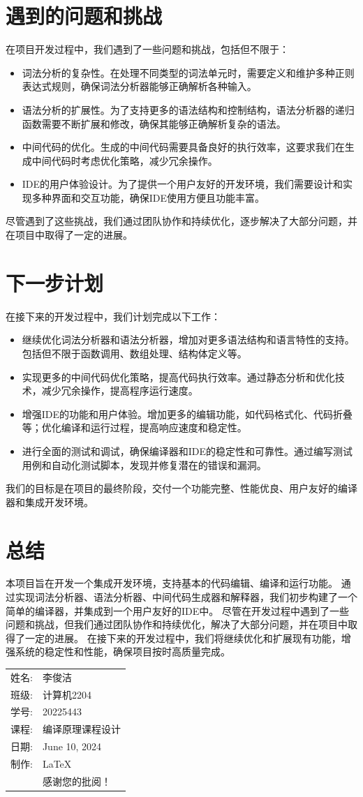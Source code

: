 \documentclass[12pt]{article}
\begin{document}
\section{遇到的问题和挑战}
\quad\quad
在项目开发过程中，我们遇到了一些问题和挑战，包括但不限于：
\begin{itemize}
    \item 词法分析的复杂性。在处理不同类型的词法单元时，需要定义和维护多种正则表达式规则，确保词法分析器能够正确解析各种输入。
    \item 语法分析的扩展性。为了支持更多的语法结构和控制结构，语法分析器的递归函数需要不断扩展和修改，确保其能够正确解析复杂的语法。
    \item 中间代码的优化。生成的中间代码需要具备良好的执行效率，这要求我们在生成中间代码时考虑优化策略，减少冗余操作。
    \item IDE的用户体验设计。为了提供一个用户友好的开发环境，我们需要设计和实现多种界面和交互功能，确保IDE使用方便且功能丰富。
\end{itemize}

尽管遇到了这些挑战，我们通过团队协作和持续优化，逐步解决了大部分问题，并在项目中取得了一定的进展。

\section{下一步计划}
\quad\quad
在接下来的开发过程中，我们计划完成以下工作：
\begin{itemize}
    \item 继续优化词法分析器和语法分析器，增加对更多语法结构和语言特性的支持。包括但不限于函数调用、数组处理、结构体定义等。
    \item 实现更多的中间代码优化策略，提高代码执行效率。通过静态分析和优化技术，减少冗余操作，提高程序运行速度。
    \item 增强IDE的功能和用户体验。增加更多的编辑功能，如代码格式化、代码折叠等；优化编译和运行过程，提高响应速度和稳定性。
    \item 进行全面的测试和调试，确保编译器和IDE的稳定性和可靠性。通过编写测试用例和自动化测试脚本，发现并修复潜在的错误和漏洞。
\end{itemize}

我们的目标是在项目的最终阶段，交付一个功能完整、性能优良、用户友好的编译器和集成开发环境。

\section{总结}
\quad\quad
本项目旨在开发一个集成开发环境，支持基本的代码编辑、编译和运行功能。
通过实现词法分析器、语法分析器、中间代码生成器和解释器，我们初步构建了一个简单的编译器，并集成到一个用户友好的IDE中。
尽管在开发过程中遇到了一些问题和挑战，但我们通过团队协作和持续优化，解决了大部分问题，并在项目中取得了一定的进展。
在接下来的开发过程中，我们将继续优化和扩展现有功能，增强系统的稳定性和性能，确保项目按时高质量完成。

\begin{flushright}\begin{tabular}{rl}
  姓名: & 李俊洁\\
  班级: & 计算机2204 \\
  学号: & 20225443 \\
  课程: & 编译原理课程设计 \\
  日期: & June 10, 2024 \\
  制作: & \LaTeX \\
  & 感谢您的批阅！
\end{tabular}\end{flushright}
\end{document}
